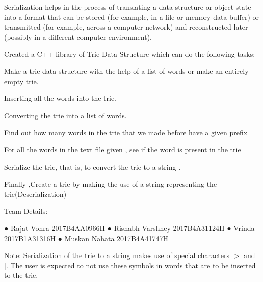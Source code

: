 Serialization helps in the process of translating a data structure or object state into a format that can be stored (for example, in a file or memory data buffer) or transmitted (for example, across a computer network) and reconstructed later (possibly in a different computer environment).

Created a C++ library of Trie Data Structure which can do the following tasks\+:
\begin{DoxyEnumerate}
\item Make a trie data structure with the help of a list of words or make an entirely empty trie.
\item Inserting all the words into the trie.
\item Converting the trie into a list of words.
\item Find out how many words in the trie that we made before have a given prefix
\item For all the words in the text file given , see if the word is present in the trie
\item Serialize the trie, that is, to convert the trie to a string .
\item Finally ,Create a trie by making the use of a string representing the trie(\+Deserialization)
\end{DoxyEnumerate}

Team-\/\+Details\+:

● Rajat Vohra 2017B4\+A\+A0966H ● Rishabh Varshney 2017B4\+A31124H ● Vrinda 2017B1\+A31316H ● Muskan Nahata 2017B4\+A41747H

Note\+: Serialization of the trie to a string makes use of special characters \textquotesingle{}$>$\textquotesingle{} and \textquotesingle{}\mbox{]}\textquotesingle{}. The user is expected to not use these symbols in words that are to be inserted to the trie. ~\newline
 